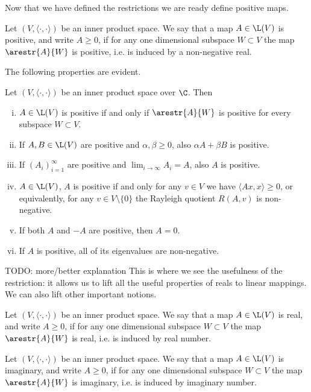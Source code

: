 Now that we have defined the restrictions we are ready define positive maps.

\begin{maar}
	Let $(V, \langle \cdot, \cdot \rangle)$ be an inner product space. We say that a map $A \in \L(V)$ is positive, and write $A \geq 0$, if for any one dimensional subspace $W \subset V$ the map $\arestr{A}{W}$ is positive, i.e. is induced by a non-negative real.
\end{maar}

The following properties are evident.

\begin{prop}
	Let $(V, \langle \cdot, \cdot \rangle)$ be an inner product space over $\C$. Then
	\begin{enumerate}[(i)]
		\item $A \in \L(V)$ is positive if and only if $\arestr{A}{W}$ is positive for every subspace $W \subset V$.
		\item If $A, B \in \L(V)$ are positive and $\alpha, \beta \geq 0$, also $\alpha A + \beta B$ is positive.
		\item If $(A_{i})_{i = 1}^{\infty}$ are positive and $\lim_{i \to \infty} A_{i} = A$, also $A$ is positive.
		\item $A \in \L(V)$, $A$ is positive if and only for any $v \in V$ we have $\langle A x, x \rangle \geq 0$, or equivalently, for any $v \in V \setminus \{0\}$ the Rayleigh quotient $R(A, v)$ is non-negative.
		\item If both $A$ and $-A$ are positive, then $A = 0$.
		\item If $A$ is positive, all of its eigenvalues are non-negative.
	\end{enumerate}
\end{prop}

TODO: more/better explanation
This is where we see the usefulness of the restriction: it allows us to lift all the useful properties of reals to linear mappings. We can also lift other important notions.

\begin{maar}
	Let $(V, \langle \cdot, \cdot \rangle)$ be an inner product space. We say that a map $A \in \L(V)$ is real, and write $A \geq 0$, if for any one dimensional subspace $W \subset V$ the map $\arestr{A}{W}$ is real, i.e. is induced by real number.
\end{maar}

\begin{maar}
	Let $(V, \langle \cdot, \cdot \rangle)$ be an inner product space. We say that a map $A \in \L(V)$ is imaginary, and write $A \geq 0$, if for any one dimensional subspace $W \subset V$ the map $\arestr{A}{W}$ is imaginary, i.e. is induced by imaginary number.
\end{maar}

